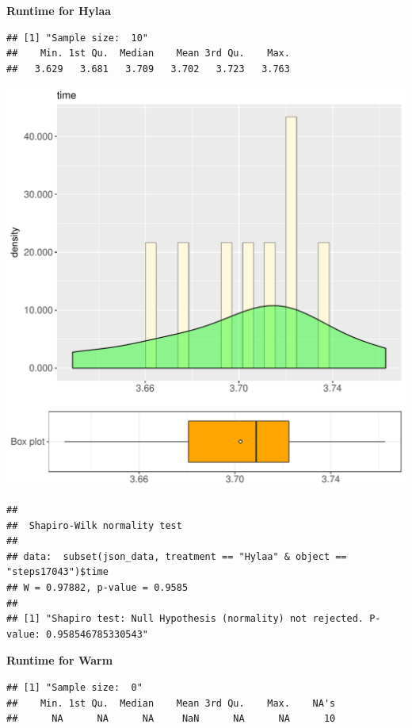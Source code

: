 \documentclass{article}\usepackage[]{graphicx}\usepackage[]{color}
\makeatletter
\def\maxwidth{ %
  \ifdim\Gin@nat@width>\linewidth
    \linewidth
  \else
    \Gin@nat@width
  \fi
}
\newenvironment{kframe}{%
 \def\at@end@of@kframe{}%
 \ifinner\ifhmode%
  \def\at@end@of@kframe{\end{minipage}}%
  \begin{minipage}{\columnwidth}%
 \fi\fi%
 \def\FrameCommand##1{\hskip\@totalleftmargin \hskip-\fboxsep
 \colorbox{shadecolor}{##1}\hskip-\fboxsep
     \hskip-\linewidth \hskip-\@totalleftmargin \hskip\columnwidth}%
 \MakeFramed {\advance\hsize-\width
   \@totalleftmargin\z@ \linewidth\hsize
   \@setminipage}}%
 {\par\unskip\endMakeFramed%
 \at@end@of@kframe}
\newenvironment{knitrout}{}{} %
\makeatother
\begin{document}
 \textbf{Runtime for Hylaa}
\begin{knitrout}
\color{fgcolor}\begin{kframe}
\begin{verbatim}
## [1] "Sample size:  10"
##    Min. 1st Qu.  Median    Mean 3rd Qu.    Max. 
##   3.629   3.681   3.709   3.702   3.723   3.763
\end{verbatim}
\end{kframe}
\includegraphics[width=\maxwidth]{figure/RH1_Hylaa_steps17043-1} 
\begin{kframe}\begin{verbatim}
## 
## 	Shapiro-Wilk normality test
## 
## data:  subset(json_data, treatment == "Hylaa" & object == "steps17043")$time
## W = 0.97882, p-value = 0.9585
## 
## [1] "Shapiro test: Null Hypothesis (normality) not rejected. P-value: 0.958546785330543"
\end{verbatim}
\end{kframe}
\end{knitrout}
 \textbf{Runtime for Warm}
\begin{knitrout}
\color{fgcolor}\begin{kframe}
\begin{verbatim}
## [1] "Sample size:  0"
##    Min. 1st Qu.  Median    Mean 3rd Qu.    Max.    NA's 
##      NA      NA      NA     NaN      NA      NA      10
\end{verbatim}
\end{kframe}
\end{knitrout}
  
\end{document}
